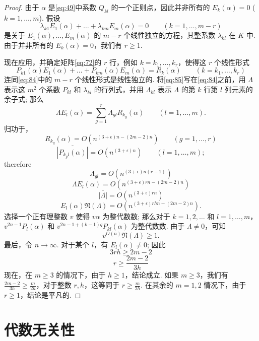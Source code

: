 \begin{proof}
由于 $\alpha$ 是\eqref{eq:49}中系数 $Q_{kl}$ 的一个正则点，因此并非所有的 $E_k(\alpha)=0$ ($k=1,\dots,m$). 假设
\begin{equation}
\lambda_{k1} E_1(\alpha) + \dots + \lambda_{km} E_m(\alpha) = 0 \qquad (k=1,\dots,m-r) \tag{84}\label{eq:84}
\end{equation}
是关于 $E_1(\alpha), \dots, E_m(\alpha)$ 的 $m-r$ 个线性独立的方程，其整系数 $\lambda_{kl}$ 在 $K$ 中. 由于并非所有的 $E_k(\alpha)=0$，我们有 $r \ge 1$.

现在应用，并确定矩阵\eqref{eq:72}的 $r$ 行，例如 $k=k_1,\dots,k_r$，使得这 $r$ 个线性形式
\begin{equation}
P_{k1}(\alpha) E_1(\alpha) + \dots + P_{km}(\alpha) E_m(\alpha) = R_k(\alpha) \qquad (k=k_1,\dots,k_r) \tag{85}\label{eq:85}
\end{equation}
连同\eqref{eq:84}中的 $m-r$ 个线性形式是线性独立的. 将\eqref{eq:85}写在\eqref{eq:84}之前，用 $\Lambda$ 表示这 $m^2$ 个系数 $P_{kl}$ 和 $\lambda_{kl}$ 的行列式，并用 $\Lambda_{kl}$ 表示 $\Lambda$ 的第 $k$ 行第 $l$ 列元素的余子式; 那么
\[\Lambda E_{l}(\alpha) = \sum_{g=1}^{r} \Lambda_{gl} R_{k_{g}}(\alpha) \qquad (l=1,\dots,m).\]
归功于，
\[R_{k_{g}}(\alpha) = O(n^{(3+\epsilon)n-(2m-2)n}) \qquad (g=1,\dots,r)\]
\[\overline{|P_{k_g l}(\alpha)|} = O(n^{(3+\epsilon)n}) \qquad (l=1,\dots,m);\]
therefore
\[\Lambda_{gl} = O \left( n^{(3+\epsilon)n(r-1)} \right)\]
\[\Lambda E_{l}(\alpha) = O \left( n^{(3+\epsilon)rn-(2m-2)n} \right)\]
\[\overline{|\Lambda|} = O \left( n^{(3+\epsilon)rn} \right)\]
\[E_{l}(\alpha) \mathfrak{N}(\Lambda) = O \left( n^{(3+\epsilon)rhn-(2m-2)n} \right).\]
选择一个正有理整数 $v$ 使得 $v \alpha$ 为整代数数; 那么对于 $k=1, 2, \dots$ 和 $l=1, \dots, m$，$v^{2n-1} P_l(\alpha)$ 和 $v^{2n-1+(k-1)q} P_{kl}(\alpha)$ 为整代数数. 由于 $\Lambda \neq 0$，可知
\[v^{O(n)} \mathfrak{N}(\Lambda) \ge 1.\]
最后，令 $n \to \infty$. 对于某个 $l$，有 $E_l(\alpha) \neq 0$; 因此
\[3rh \ge 2m-2\]
\[r \ge \frac{2m-2}{3h}\]
现在，在 $m \ge 3$ 的情况下，由于 $h \ge 1$，结论成立. 如果 $m \ge 3$，我们有 $\frac{2m-2}{3h} \ge \frac{m}{2h}$，对于整数 $r, h$，这等同于 $r \ge \frac{m}{2h}$. 在其余的 $m=1, 2$ 情况下，由于 $r \ge 1$，结论是平凡的.
\end{proof}

\section{代数无关性}

